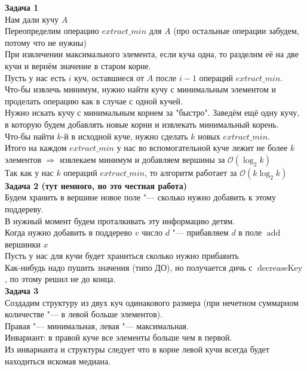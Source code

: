 \documentclass[14pt,a4paper,report]{ncc}
\begin{document}
\textbf{Задача 1}\\
Нам дали кучу $A$\\
Переопределим операцию $extract\_min$ для $A$ (про остальные операции забудем, потому что не нужны)\\
При извлечении максимального элемента, если куча одна, то разделим её на две кучи и вернём значение в старом корне.\\
Пусть у нас есть $i$ куч, оставшиеся от $A$ после $i-1$ операций $extract\_min$.\\
Что-бы извлечь минимум, нужно найти кучу с минимальным элементом и проделать операцию как в случае с одной кучей.\\
Нужно искать кучу с минимальным корнем за "быстро". Заведём ещё одну кучу, в которую будем добавлять новые корни и извлекать минимальный корень.\\
Что-бы найти $k$-й в исходной куче, нужно сделать $k$ новых $extract\_min$.\\
Итого на каждом $extract\_min$ у нас во вспомогательной куче лежит не более $k$ элементов $\Rightarrow$ извлекаем минимум и добавляем вершины за $\mathcal{O}(\log_2{k})$\\
Так как у нас $k$ операций $extract\_min$, то алгоритм работает за $\mathcal{O}(k\log_2{k})$\\



\textbf{Задача 2 (тут немного, но это честная работа)}\\
Будем хранить в вершине новое поле "--- сколько нужно добавить к этому поддереву.\\
В нужный момент будем проталкивать эту информацию детям.\\
Когда нужно добавить в поддерево $v$ число $d$ "--- прибавляем $d$ в поле $\operatorname{add}$ вершинки $x$\\
Пусть у нас для кучи будет храниться сколько нужно прибавить\\
Как-нибудь надо пушить значения (типо ДО), но получается дичь с $\operatorname{decreaseKey}$, по этому решил не до конца.\\







\textbf{Задача 3}\\
Создадим структуру из двух куч одинакового размера (при нечетном суммарном количестве "--- в левой больше элементов).\\ Правая "--- минимальная, левая "--- максимальная.\\
Инвариант: в правой куче все элементы больше чем в первой.\\
Из инварианта и структуры следует что в корне левой кучи всегда будет находиться искомая медиана.\\
\end{document}
